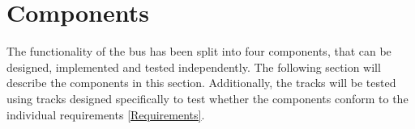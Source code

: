 \section{Components}
The functionality of the bus has been split into four components, that can be designed, implemented and tested independently. The following section will describe the components in this section. Additionally, the tracks will be tested using tracks designed specifically to test whether the components conform to the individual requirements \ref{Requirements}.






